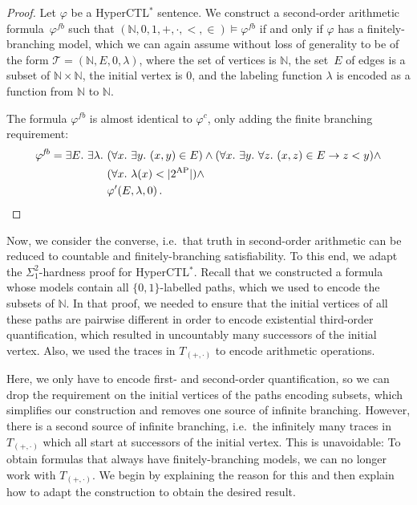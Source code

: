 \documentclass[dvipsnames,10pt,a4paper]{amsart}
\theoremstyle{definition}
\theoremstyle{remark}
\newcommand{\set}[1]{\{#1\}}
\newcommand{\nats}{\mathbb{N}}
\renewcommand{\phi}{\varphi}
\newcommand{\tsys}{\mathcal{T}}
\newcommand{\hyctlstar}{{HyperCTL$^*$}\xspace}
\newcommand\AP{\textup{AP}}
\newcommand\Top{T_{({+},{\cdot})}}
\renewcommand{\phi}{\varphi}
\newcommand\phicount{\phi^{\mathit{c}}}
\newcommand\phifb{\phi^{\mathit{fb}}}
\begin{document}
\begin{proof}
  Let $\phi$ be a \hyctlstar sentence. We construct a second-order
  arithmetic formula~$\phifb$ such that
  $(\nats,0,1,+,\cdot,<,\in) \models \phifb$ if and only if $\phi$ has a
  finitely-branching model, which we can again assume without loss of
  generality to be of the form $\tsys = (\nats,E,0,\lambda)$, where the set of
  vertices is $\nats$, the set~$E$ of edges is a subset of
  $\nats \times \nats$, the initial vertex is $0$, and the labeling function
  $\lambda$ is encoded as a function from  $\nats$ to $ \nats$.

  The formula $\phifb$ is almost identical to $\phicount$, only adding the
  finite branching requirement:
  \begin{align*}
    \phifb = \exists E.\ \exists \lambda.\ &
    (\forall x.\ \exists y.\ (x,y) \in E) \land
    (\forall x.\ \exists y.\ \forall z.\ (x,z) \in E \rightarrow z < y) \land\\
    &     (\forall x.\ \lambda(x) < |2^\AP|) \land \\
   & \phi'(E,\lambda,0) \, . \qedhere     
  \end{align*}
  
\end{proof}


Now, we consider the converse, i.e.\ that truth in second-order arithmetic can be reduced to countable and finitely-branching satisfiability. To this end, we adapt the $\Sigma_1^2$-hardness proof for \hyctlstar. 
Recall that we constructed a formula whose models contain all $\set{0,1}$-labelled paths, which we used to encode the subsets of $\nats$. 
In that proof, we needed to ensure that the initial vertices of all these paths are pairwise different in order to encode existential third-order quantification, which resulted in uncountably many successors of the initial vertex.
Also, we used the traces in $\Top$ to encode arithmetic operations. 

Here, we only have to encode first- and second-order quantification, so we can drop the requirement on the initial vertices of the paths encoding subsets, which simplifies our construction and removes one source of infinite branching.
However, there is a second source of infinite branching, i.e.\ the infinitely many traces in $\Top$ which all start at successors of the initial vertex. This is unavoidable: To obtain formulas that always have finitely-branching models, we can no longer work with $\Top$.
We begin by explaining the reason for this and then explain how to adapt the construction to obtain the desired result. 
\end{document}

